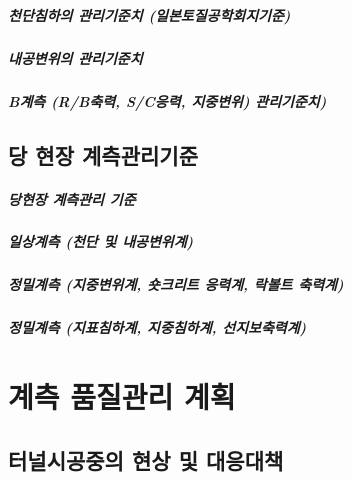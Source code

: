 \documentclass[12pt, a4paper, oneside]{book}
\let\stdsection\section
\renewcommand\section{\newpage\stdsection}
\begin{document}
		\paragraph{천단침하의 관리기준치 (일본토질공학회지기준)}
		
		\paragraph{내공변위의 관리기준치}
		

		\paragraph{B계측 (R/B축력, S/C응력, 지중변위) 관리기준치)}
		
		
		
	\section{당 현장 계측관리기준}
			
		\paragraph{당현장 계측관리 기준}
		
		\paragraph{일상계측 (천단 및 내공변위계)}
		
		\paragraph{정밀계측 (지중변위계, 숏크리트 응력계, 락볼트 축력계)}

		\paragraph{정밀계측 (지표침하계, 지중침하계, 선지보축력계)}


	\chapter{계측 품질관리 계획}
	\minitoc				%
	
	\section{터널시공중의 현상 및 대응대책}
	
\end{document}
